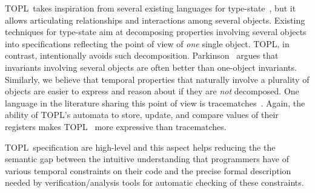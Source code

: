\documentclass{sigplanconf}[10pt] %
\newcommand{\TPL}{TOPL}
\begin{document}
\TPL \ takes inspiration from several existing  languages for type-state~\cite{strom1986,dblp:conf/oopsla/bierhoffa07,dblp:conf/oopsla/naeeml08,disney2011,ball2002}, but  it allows 
articulating  relationships and interactions among several objects.
Existing techniques for type-state aim at decomposing properties involving several objects into specifications reflecting the point of view of {\em one} single object. TOPL, in contrast,  intentionally avoids such decomposition.
Parkinson~\cite{parkinson-iwaco2007} argues that invariants involving several objects are often better than one-object invariants.  Similarly, we believe that temporal properties that naturally involve a plurality of objects are easier to express and reason about if they are \emph{not} decomposed. 
One language in the literature sharing this point of view is tracematches~\cite{DBLP:conf/oopsla/AllanACHKLMSST05}. 
%
Again, the ability of \TPL's automata to store,  update, and compare values of their registers 
makes TOPL \ more expressive than tracematches.

\TPL \ specification are high-level and this aspect
helps reducing the the semantic gap between the intuitive understanding that programmers have of various temporal constraints on their code and the precise formal description needed by verification/analysis tools for automatic checking of these constraints.


%

\end{document}
